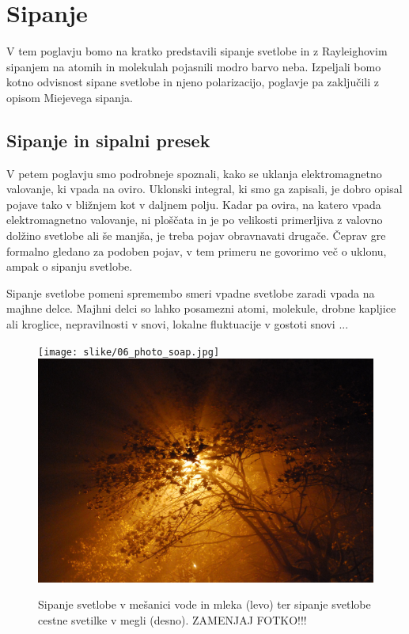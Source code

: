 
\chapter{Sipanje}
V tem poglavju bomo na kratko predstavili sipanje svetlobe in z Rayleighovim
sipanjem na atomih in molekulah pojasnili modro barvo neba. Izpeljali bomo 
kotno odvisnost sipane svetlobe in njeno polarizacijo, poglavje pa zaključili
z opisom Miejevega sipanja.

\section{Sipanje in sipalni presek}
V petem poglavju smo podrobneje spoznali, kako se uklanja elektromagnetno 
valovanje, ki vpada na oviro. Uklonski integral, ki smo ga zapisali,
je dobro opisal pojave tako v bližnjem kot v daljnem polju. Kadar pa ovira,
na katero vpada elektromagnetno valovanje, ni ploščata in je 
po velikosti primerljiva z valovno dolžino svetlobe ali še manjša, je treba 
pojav obravnavati drugače. Čeprav gre formalno gledano za podoben pojav,
v tem primeru ne govorimo več o uklonu, ampak o sipanju svetlobe.

Sipanje svetlobe pomeni spremembo smeri vpadne svetlobe zaradi vpada na majhne delce. 
Majhni delci so lahko posamezni atomi, molekule, drobne kapljice ali kroglice, 
nepravilnosti v snovi, lokalne fluktuacije v gostoti snovi ... 
\begin{figure}[!h]
\centering
\texttt{[image: slike/06\_photo\_soap.jpg]}\hfill
\includegraphics[width=7truecm]{slike/07_megla.jpg}
\caption{Sipanje svetlobe v mešanici vode in mleka (levo) ter sipanje svetlobe 
cestne svetilke v megli (desno). ZAMENJAJ FOTKO!!!}
\label{fig:07_Sipanje}
\end{figure}

